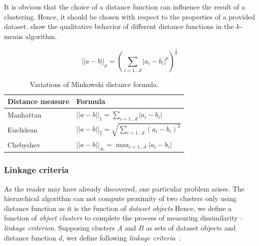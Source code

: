 It is obvious that the choice of a distance function can influence the result of a clustering. Hence, it should be chosen with respect to the properties of a provided dataset. \citet{aggarwal2001surprising} show the qualitative behavior of different distance functions in the $k$-means algorithm.  

\begin{equation}\label{eq01:mink}
||a-b||_p = (\sum_{i=1...d}|a_i-b_i|^p)^{\frac{1}{p}}
\end{equation}

\begin{table}
	\centering
	\begin{tabular}{ll}
		\toprule
		Distance measure & Formula \\
		\midrule
		Manhattan & $||a-b||_1 = \sum_{i=1...d}|a_i-b_i|$          \\
		Euclidean & $||a-b||_2 = \sqrt{\sum_{i=1...d}(a_i-b_i)^2}$ \\
		Chebyshev & $||a-b||_\infty = \max_{i=1\dots d}|a_i-b_i|$  \\ \bottomrule
	\end{tabular}
	\caption{Variations of Minkowski distance formula.}
	\label{tab01:mink}
\end{table}

\subsubsection{Linkage criteria}

As the reader may have already discovered, one particular problem arises. The hierarchical algorithm can not compute proximity of two clusters only using distance function as it is the function of \emph{dataset objects} Hence, we define a function of \emph{object clusters} to complete the process of measuring dissimilarity -- \emph{linkage criterion}. Supposing clusters $A$ and $B$ as sets of dataset objects and distance function $d$, wer define following \emph{linkage criteria}~\cite{yim2015hierarchical}:

